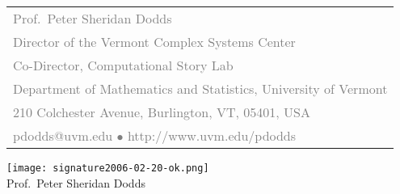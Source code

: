\documentclass[11pt]{article}
\begin{document}
\sffamily 


{ \small
\begin{tabular}[b]{l}
\textcolor{grey}{Prof.\ Peter Sheridan Dodds}\\
\textcolor{grey}{Director of the Vermont Complex Systems Center}\\
\textcolor{grey}{Co-Director, Computational Story Lab}\\
\textcolor{grey}{Department of Mathematics and Statistics, University of Vermont}\\
\textcolor{grey}{210 Colchester Avenue, Burlington, VT, 05401, USA}\\
\textcolor{grey}{pdodds@uvm.edu
$\bullet$
http://www.uvm.edu/pdodds}
\end{tabular}
}


\bigskip
\bigskip



\texttt{[image: signature2006-02-20-ok.png]}\\
Prof.\ Peter Sheridan Dodds



\end{document}
